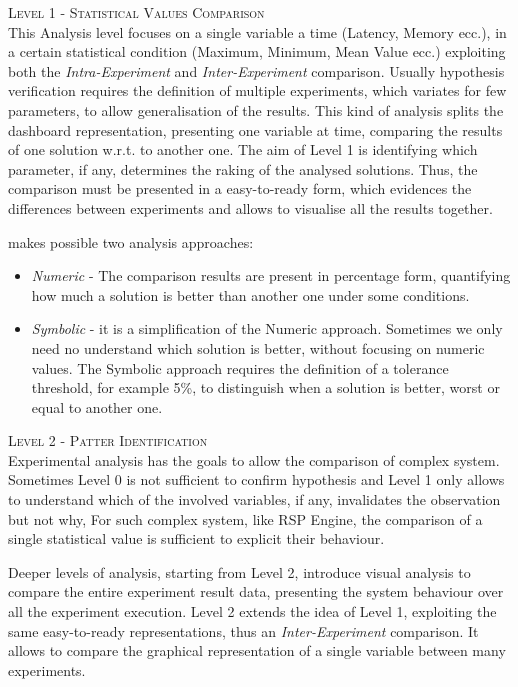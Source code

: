 \textsc{Level 1 -  Statistical Values Comparison}\\

This Analysis level focuses on a single variable a time (Latency, Memory ecc.), in a certain statistical condition (Maximum, Minimum, Mean Value ecc.) exploiting both the \textit{Intra-Experiment} and \textit{Inter-Experiment} comparison. Usually hypothesis verification requires the definition of multiple experiments, which variates for few parameters, to allow generalisation of the results. This kind of analysis splits the dashboard representation, presenting one variable at time, comparing the results of one solution w.r.t. to another one. 
The aim of Level 1 is identifying which parameter, if any, determines the raking of the analysed solutions. Thus, the comparison must be presented in a easy-to-ready form, which evidences the differences between experiments and allows to visualise all the results together.

\name makes possible two analysis approaches:
\begin{itemize}
\item \textit{Numeric} -  The comparison results are present in percentage form, quantifying how much a solution is better than another one under some conditions. 
\item \textit{Symbolic} - it is a simplification of the Numeric approach. Sometimes we only need no understand which solution is better, without focusing on numeric values. The Symbolic approach requires the definition of a tolerance threshold, for example 5\%, to distinguish when a solution is better, worst or equal to another one.\\

\end{itemize}
\textsc{Level 2 - Patter Identification}\\

Experimental analysis has the goals to allow the comparison of complex system. Sometimes Level 0 is not sufficient to confirm hypothesis and  Level 1 only allows to understand which of the involved variables, if any, invalidates the observation but not why, For such complex system, like RSP Engine, the comparison of a single statistical value is sufficient to explicit their behaviour.

Deeper levels of analysis, starting from Level 2, introduce visual analysis to compare the entire experiment result data, presenting the system behaviour over all the experiment execution. Level 2 extends the idea of Level 1, exploiting the same easy-to-ready representations, thus an \textit{Inter-Experiment} comparison. It allows to compare the graphical representation of a single variable between many experiments.

